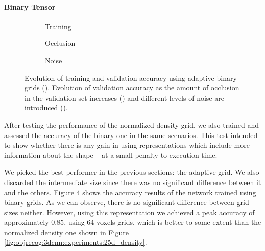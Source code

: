 \paragraph{Binary Tensor}

\begin{figure}[!t]
	\centering
	\begin{subfigure}{\textwidth}
		
		\caption{Training}
		\label{subfig:objrecog:3dcnn:experiments:25d_adaptive_binary}
	\end{subfigure}
	\centering
	\begin{subfigure}{0.49\linewidth}
		
		\caption{Occlusion}
		\label{subfig:objrecog:3dcnn:experiments:25d_adaptive_binary_occlusion}
	\end{subfigure}
	\hfill
	\begin{subfigure}{0.49\linewidth}
		
		\caption{Noise}
		\label{subfig:objrecog:3dcnn:experiments:25d_adaptive_binary_noise}
	\end{subfigure}
	\caption{Evolution of training and validation accuracy using adaptive binary grids (). Evolution of validation accuracy as the amount of occlusion in the validation set increases () and different levels of noise are introduced ().}
	\label{fig:objrecog:3dcnn:experiments:25d_binary}
\end{figure}

After testing the performance of the normalized density grid, we also trained and assessed the accuracy of the binary one in the same scenarios. This test intended to show whether there is any gain in using representations which include more information about the shape -- at a small penalty to execution time.

We picked the best performer in the previous sections: the adaptive grid. We also discarded the intermediate size since there was no significant difference between it and the others. Figure \ref{fig:objrecog:3dcnn:experiments:25d_binary} shows the accuracy results of the network trained using binary grids. As we can observe, there is no significant difference between grid sizes neither. However, using this representation we achieved a peak accuracy of approximately $0.85$, using $64$ voxels grids, which is better to some extent than the normalized density one shown in Figure \ref{fig:objrecog:3dcnn:experiments:25d_density}.

